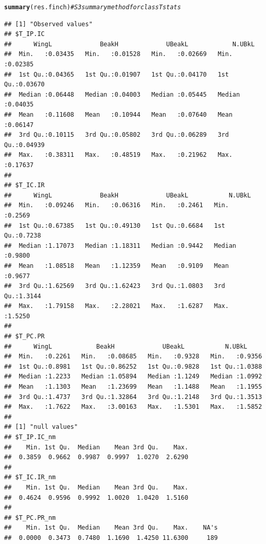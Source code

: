 \documentclass[12pt]{article}\usepackage[]{graphicx}\usepackage[]{color}
\makeatletter
\newcommand{\hlcom}[1]{\textcolor[rgb]{0.678,0.584,0.686}{\textit{#1}}}%
\newcommand{\hlstd}[1]{\textcolor[rgb]{0.345,0.345,0.345}{#1}}%
\newcommand{\hlkwd}[1]{\textcolor[rgb]{0.737,0.353,0.396}{\textbf{#1}}}%
\newenvironment{kframe}{%
 \def\at@end@of@kframe{}%
 \ifinner\ifhmode%
  \def\at@end@of@kframe{\end{minipage}}%
  \begin{minipage}{\columnwidth}%
 \fi\fi%
 \def\FrameCommand##1{\hskip\@totalleftmargin \hskip-\fboxsep
 \colorbox{shadecolor}{##1}\hskip-\fboxsep
     \hskip-\linewidth \hskip-\@totalleftmargin \hskip\columnwidth}%
 \MakeFramed {\advance\hsize-\width
   \@totalleftmargin\z@ \linewidth\hsize
   \@setminipage}}%
 {\par\unskip\endMakeFramed%
 \at@end@of@kframe}
\newenvironment{knitrout}{}{} %
\makeatother
\begin{document}
\newpage

\begin{knitrout}
\color{fgcolor}\begin{kframe}
\begin{alltt}
\hlkwd{summary}\hlstd{(res.finch)} \hlcom{#S3 summary method for class Tstats}
\end{alltt}
\begin{verbatim}
## [1] "Observed values"
## $T_IP.IC
##      WingL             BeakH             UBeakL            N.UBkL       
##  Min.   :0.03435   Min.   :0.01528   Min.   :0.02669   Min.   :0.02385  
##  1st Qu.:0.04365   1st Qu.:0.01907   1st Qu.:0.04170   1st Qu.:0.03670  
##  Median :0.06448   Median :0.04003   Median :0.05445   Median :0.04035  
##  Mean   :0.11608   Mean   :0.10944   Mean   :0.07640   Mean   :0.06147  
##  3rd Qu.:0.10115   3rd Qu.:0.05802   3rd Qu.:0.06289   3rd Qu.:0.04939  
##  Max.   :0.38311   Max.   :0.48519   Max.   :0.21962   Max.   :0.17637  
## 
## $T_IC.IR
##      WingL             BeakH             UBeakL           N.UBkL      
##  Min.   :0.09246   Min.   :0.06316   Min.   :0.2461   Min.   :0.2569  
##  1st Qu.:0.67385   1st Qu.:0.49130   1st Qu.:0.6684   1st Qu.:0.7238  
##  Median :1.17073   Median :1.18311   Median :0.9442   Median :0.9800  
##  Mean   :1.08518   Mean   :1.12359   Mean   :0.9109   Mean   :0.9677  
##  3rd Qu.:1.62569   3rd Qu.:1.62423   3rd Qu.:1.0803   3rd Qu.:1.3144  
##  Max.   :1.79158   Max.   :2.28021   Max.   :1.6287   Max.   :1.5250  
## 
## $T_PC.PR
##      WingL            BeakH             UBeakL           N.UBkL      
##  Min.   :0.2261   Min.   :0.08685   Min.   :0.9328   Min.   :0.9356  
##  1st Qu.:0.8981   1st Qu.:0.86252   1st Qu.:0.9828   1st Qu.:1.0388  
##  Median :1.2233   Median :1.05894   Median :1.1249   Median :1.0992  
##  Mean   :1.1303   Mean   :1.23699   Mean   :1.1488   Mean   :1.1955  
##  3rd Qu.:1.4737   3rd Qu.:1.32864   3rd Qu.:1.2148   3rd Qu.:1.3513  
##  Max.   :1.7622   Max.   :3.00163   Max.   :1.5301   Max.   :1.5852  
## 
## [1] "null values"
## $T_IP.IC_nm
##    Min. 1st Qu.  Median    Mean 3rd Qu.    Max. 
##  0.3859  0.9662  0.9987  0.9997  1.0270  2.6290 
## 
## $T_IC.IR_nm
##    Min. 1st Qu.  Median    Mean 3rd Qu.    Max. 
##  0.4624  0.9596  0.9992  1.0020  1.0420  1.5160 
## 
## $T_PC.PR_nm
##    Min. 1st Qu.  Median    Mean 3rd Qu.    Max.    NA's 
##  0.0000  0.3473  0.7480  1.1690  1.4250 11.6300     189
\end{verbatim}
\end{kframe}
\end{knitrout}
\end{document}
